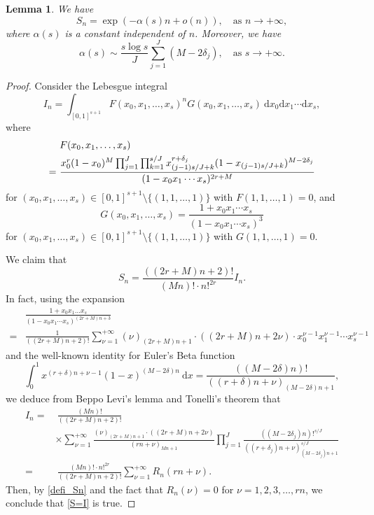 \documentclass[12pt]{article}
\newtheorem{lemma}[theorem]{Lemma}
\numberwithin{equation}{section}
\begin{document}
\begin{lemma}\label{lem_ana_S_n}
We have 
\begin{equation}\label{S_n_estimate}
S_n = \exp\left( -\alpha(s)n + o(n) \right), \quad \text{as~} n \to +\infty, 
\end{equation}
where $\alpha(s)$ is a constant independent of $n$. Moreover, we have
\begin{equation}\label{alpha}
\alpha(s) \sim \frac{s \log s}{J} \sum_{j=1}^{J} (M-2\delta_j), \quad \text{as~} s \to +\infty. 
\end{equation}
\end{lemma}

\begin{proof}
Consider the Lebesgue integral
\begin{equation}\label{defi_I_n}
I_n = \int_{[0,1]^{s+1}} F(x_0,x_1,\ldots,x_s)^n G(x_0,x_1,\ldots,x_s)~\mathrm{d}x_0\mathrm{d}x_1 \cdots \mathrm{d}x_s, 
\end{equation} 
where
\begin{align}
&~ F(x_0,x_1,\ldots,x_s) \notag\\
=&~  \frac{x_0^{r}(1-x_0)^{M}\prod_{j=1}^{J}\prod_{k=1}^{s/J} x_{(j-1)s/J +k}^{r+\delta_j} (1-x_{(j-1)s/J +k})^{M-2\delta_j} }{(1-x_0x_1\cdots x_s)^{2r+M}} \label{F}
\end{align}
for $(x_0,x_1,\ldots,x_s) \in [0,1]^{s+1} \setminus \{(1,1,\ldots,1)\}$ with $F(1,1,\ldots,1)=0$, and
\begin{equation*}
G(x_0,x_1,\ldots,x_s) = \frac{1+x_0x_1\cdots x_{s}}{(1-x_0x_1\cdots x_s)^3}
\end{equation*}
for $(x_0,x_1,\ldots,x_s) \in [0,1]^{s+1} \setminus \{(1,1,\ldots,1)\}$ with $G(1,1,\ldots,1)=0$.

We claim that 
\begin{equation}\label{S=I}
S_n = \frac{((2r+M)n+2)!}{(Mn)! \cdot n!^{2r}} I_n.
\end{equation}
In fact, using the expansion 
\begin{align*}
&\frac{1+x_0x_1\ldots x_s}{(1-x_0x_1\cdots x_s)^{(2r+M)n+3}} \\
=& \frac{1}{((2r+M)n+2)!}\sum_{\nu=1}^{+\infty} (\nu)_{(2r+M)n+1} \cdot ((2r+M)n+2\nu)  \cdot x_0^{\nu-1}x_1^{\nu-1}\cdots x_{s}^{\nu-1} 
\end{align*}
and the well-known identity for Euler's Beta function
\[ \int_{0}^{1} x^{(r+\delta)n+\nu-1}(1-x)^{(M-2\delta)n}~\mathrm{d}x = \frac{((M-2\delta)n)!}{((r+\delta)n+\nu)_{(M-2\delta)n+1}}, \]
we deduce from Beppo Levi's lemma and Tonelli's theorem that
\begin{align*}
I_n =&~ \frac{(Mn)!}{((2r+M)n+2)!} \\ &\times \sum_{\nu=1}^{+\infty} \frac{(\nu)_{(2r+M)n+1} \cdot ((2r+M)n+2\nu)}{(rn+\nu)_{Mn+1}} \prod_{j=1}^{J} \frac{((M-2\delta_j)n)!^{s/J}}{((r+\delta_j)n+\nu)_{(M-2\delta_j)n+1}^{s/J}} \\
=&~ \frac{(Mn)!\cdot n!^{2r}}{((2r+M)n+2)!} \sum_{\nu=1}^{+\infty} R_n(rn+\nu).
\end{align*}
Then, by \eqref{defi_Sn} and the fact that $R_n(\nu)=0$ for $\nu=1,2,3,\ldots,rn$, we conclude that \eqref{S=I} is true.



\end{proof}
\end{document}
